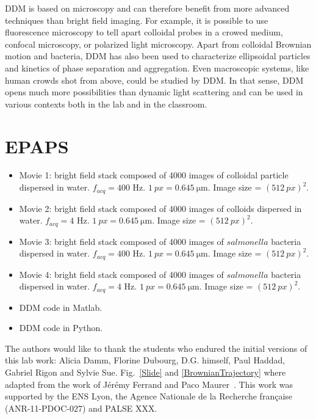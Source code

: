 \documentclass[%
 aip,
 jmp,%
 amsmath,amssymb,
reprint,%
]{revtex4-1}
\begin{document}
DDM is based  on microscopy and can therefore benefit from  more advanced techniques than bright field imaging. For example, it is possible to use fluorescence microscopy to tell apart colloidal probes in a crowed medium\cite{Hendricks2015}, confocal microscopy\cite{Lu2012}, or polarized light microscopy\citep{20_reufer2012differential}. Apart from colloidal Brownian motion and bacteria, DDM has also been used to characterize ellipsoidal particles\citep{20_reufer2012differential} and kinetics of phase separation\cite{Gao2015} and aggregation\cite{Ferri2011}. Even macroscopic systems, like human crowds shot from above, could be studied by DDM. In that sense, DDM opens much more possibilities than dynamic light scattering and can be used in various contexts both in the lab and in the classroom.

\section*{\label{epaps}EPAPS}
\begin{itemize}
 \item Movie 1: bright field stack composed of 4000 images of colloidal particle dispersed in water. $f_{acq}=400$ Hz. $\SI{1}{px} = \SI{0.645}{\micro\meter}$. Image size = $(\SI{512}{px})^2$.
 \item Movie 2: bright field stack composed of 4000 images of colloids dispersed in water. $f_{acq}=4$ Hz. $\SI{1}{px} = \SI{0.645}{\micro\meter}$. Image size = $(\SI{512}{px})^2$.
 \item Movie 3: bright field stack composed of 4000 images of $salmonella$ bacteria dispersed in water. $f_{acq}=400$ Hz. $\SI{1}{px} = \SI{0.645}{\micro\meter}$. Image size = $(\SI{512}{px})^2$.
 \item Movie 4: bright field stack composed of 4000 images of $salmonella$ bacteria dispersed in water. $f_{acq}=4$ Hz. $\SI{1}{px} = \SI{0.645}{\micro\meter}$. Image size = $(\SI{512}{px})^2$.
 \item DDM code in Matlab.
 \item DDM code in Python.
\end{itemize}

\begin{acknowledgments}
The authors would like to thank the students who endured the initial versions of this lab work: Alicia Damm, Florine Dubourg, D.G. himself, Paul Haddad, Gabriel Rigon and Sylvie Sue. Fig.~\ref{Slide} and \ref{BrownianTrajectory} where adapted from the work of J\'er\'emy Ferrand and Paco Maurer~\cite{Maurer2014}. 
This work was supported by the ENS Lyon, the Agence Nationale de la Recherche fran\c{c}aise (ANR-11-PDOC-027) and PALSE XXX.
\end{acknowledgments}



\end{document}
